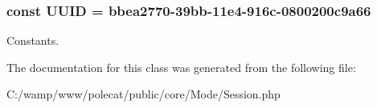 \subsubsection[{U\+U\+I\+D}]{\setlength{\rightskip}{0pt plus 5cm}const U\+U\+I\+D = \textquotesingle{}bbea2770-\/39bb-\/11e4-\/916c-\/0800200c9a66\textquotesingle{}}\label{class_able_polecat___mode___session_a74b892c8c0b86bf9d04c5819898c51e7}
Constants. 

The documentation for this class was generated from the following file\+:\begin{DoxyCompactItemize}
\item 
C\+:/wamp/www/polecat/public/core/\+Mode/Session.\+php\end{DoxyCompactItemize}
